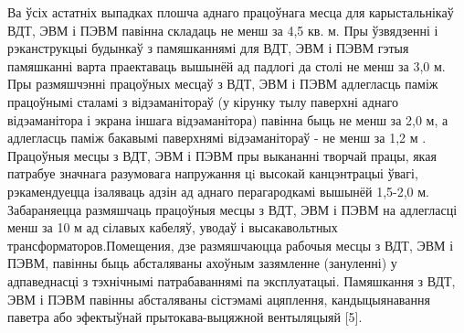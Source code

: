 Ва ўсіх астатніх выпадках плошча аднаго працоўнага месца для карыстальнікаў ВДТ, ЭВМ і ПЭВМ павінна складаць не менш за 4,5 кв. м.
Пры ўзвядзенні і рэканструкцыі будынкаў з памяшканнямі для ВДТ, ЭВМ і ПЭВМ гэтыя памяшканні варта праектаваць вышынёй ад падлогі да столі не менш за 3,0 м.
Пры размяшчэнні працоўных месцаў з ВДТ, ЭВМ і ПЭВМ адлегласць паміж працоўнымі сталамі з відэаманітораў (у кірунку тылу паверхні аднаго відэаманітора і экрана іншага відэаманітора) павінна быць не менш за 2,0 м, а адлегласць паміж бакавымі паверхнямі відэаманітораў - не менш за 1,2 м .
Працоўныя месцы з ВДТ, ЭВМ і ПЭВМ пры выкананні творчай працы, якая патрабуе значнага разумовага напружання цi высокай канцэнтрацыі ўвагі, рэкамендуецца ізаляваць адзін ад аднаго перагародкамі вышынёй 1,5-2,0 м.
Забараняецца размяшчаць працоўныя месцы з ВДТ, ЭВМ і ПЭВМ на адлегласці менш за 10 м ад сілавых кабеляў, уводаў і высакавольтных трансформаторов.Помещения, дзе размяшчаюцца рабочыя месцы з ВДТ, ЭВМ і ПЭВМ, павінны быць абсталяваны ахоўным зазямленне (зануленні) у адпаведнасці з тэхнічнымі патрабаваннямі па эксплуатацыі.
Памяшкання з ВДТ, ЭВМ і ПЭВМ павінны абсталяваны сістэмамі ацяплення, кандыцыянавання паветра або эфектыўнай прытокава-выцяжной вентыляцыяй [5].
